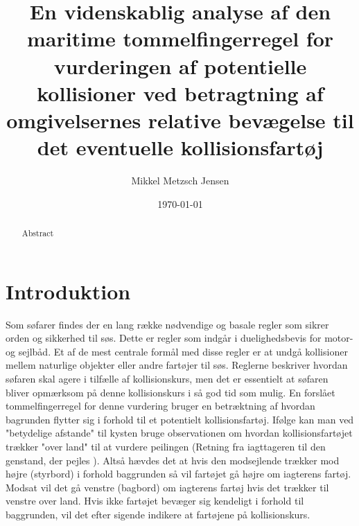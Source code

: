 \documentclass[%
 reprint,
nofootinbib,
aps,
]{revtex4-1}
\begin{document}
\title{En videnskablig analyse af den maritime tommelfingerregel for vurderingen af potentielle kollisioner ved betragtning af omgivelsernes relative bevægelse til det eventuelle kollisionsfartøj}
\author{Mikkel Metzsch Jensen}

\date{\today}



\begin{abstract}
  Abstract
\end{abstract}

\maketitle
\newpage


\section{Introduktion}
Som søfarer findes der en lang række nødvendige og basale regler som sikrer orden og sikkerhed til søs. Dette er regler som indgår i duelighedsbevis for motor- og sejlbåd. Et af de mest centrale formål med disse regler er at undgå kollisioner mellem naturlige objekter eller andre fartøjer til søs. Reglerne beskriver hvordan søfaren skal agere i tilfælle af kollisionskurs, men det er essentielt at søfaren bliver opmærksom på denne kollisionskurs i så god tid som mulig.
En forslået tommelfingerregel for denne vurdering bruger en betræktning af hvordan bagrunden flytter sig i forhold til et potentielt kollisionsfartøj. Ifølge \cite{duelighed} kan man ved "betydelige afstande" til kysten bruge observationen om hvordan kollisionsfartøjet trækker "over land" til at vurdere peilingen (Retning fra iagttageren til den genstand, der pejles \cite{ordbog}). Altså hævdes det at hvis den modsejlende trækker mod højre (styrbord) i forhold baggrunden så vil fartøjet gå højre om iagterens fartøj. Modsat vil det gå venstre (bagbord) om iagterens fartøj hvis det trækker til venstre over land. Hvis ikke fartøjet bevæger sig kendeligt i forhold til baggrunden, vil det efter sigende indikere at fartøjene på kollisionskurs. \\
\end{document}

